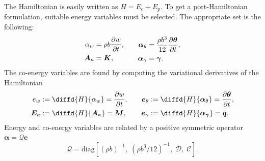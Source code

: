 \documentclass{ifacconf}
\begin{document}
The Hamiltonian  is easily written as $H = E_c + E_p$. To get a port-Hamiltonian formulation, suitable energy variables must be selected. The appropriate set is the following:
\begin{equation}
\begin{aligned}
\alpha_w &= \rho b \diffp{w}{t}, \\
\bm{A}_{\kappa} &= \bm{K}, \\
\end{aligned} \qquad
\begin{aligned}
\bm\alpha_{\theta} &= \frac{\rho b^3}{12} \diffp{\bm{\theta}}{t}, \\
\bm\alpha_{\gamma} &= \bm{\gamma}. \\
\end{aligned}
\end{equation}
The co-energy variables are found by computing the variational derivatives of the Hamiltonian
\begin{equation}
\begin{aligned}
e_w &:= \diffd{H}{\alpha_w} = \diffp{w}{t},  \\
\bm{E}_{\kappa} &:= \diffd{H}{\bm{A}_{\kappa}} = \bm{M}, \\
\end{aligned} \qquad
\begin{aligned}
\bm{e}_{\theta} &:= \diffd{H}{\bm\alpha_{\theta}} = \diffp{\bm{\theta}}{t}, \\
\bm{e}_{\gamma} &:= \diffd{H}{\bm{\alpha}_{\bm{\gamma}}} = \bm{q}. \\
\end{aligned}
\end{equation}
Energy and co-energy variables are related by a positive symmetric operator $\bm{\alpha} = \mathcal{Q} \bm{e}$
\begin{equation}
\mathcal{Q} = \mathrm{diag}[(\rho b)^{-1}, \; (\rho b^3/12)^{-1} , \; \mathcal{D}, \; \mathcal{C}].
\end{equation}
\end{document}
